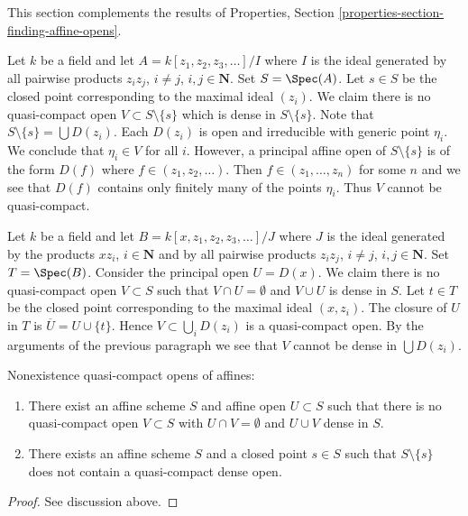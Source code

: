 \noindent
This section complements the results of
Properties, Section \ref{properties-section-finding-affine-opens}.

\medskip\noindent
Let $k$ be a field and let $A = k[z_1, z_2, z_3, \ldots]/I$ where $I$
is the ideal generated by all pairwise products
$z_iz_j$, $i \not = j$, $i, j \in \mathbf{N}$. Set $S = \Spec(A)$.
Let $s \in S$ be the closed point corresponding to the maximal
ideal $(z_i)$. We claim there is no
quasi-compact open $V \subset S \setminus \{s\}$ which is
dense in $S \setminus \{s\}$. Note that $S \setminus \{s\} = \bigcup D(z_i)$.
Each $D(z_i)$ is open and irreducible with generic point
$\eta_i$. We conclude that $\eta_i \in V$ for all $i$.
However, a principal affine open of $S \setminus \{s\}$ is
of the form $D(f)$ where $f \in (z_1, z_2, \ldots)$. Then
$f \in (z_1, \ldots, z_n)$ for some $n$ and we see that $D(f)$ contains
only finitely many of the points $\eta_i$. Thus $V$ cannot be quasi-compact.

\medskip\noindent
Let $k$ be a field and let $B = k[x, z_1, z_2, z_3, \ldots]/J$ where $J$
is the ideal generated by the products $xz_i$, $i \in \mathbf{N}$ and by
all pairwise products $z_iz_j$, $i \not = j$, $i, j \in \mathbf{N}$.
Set $T = \Spec(B)$. Consider the principal open $U = D(x)$.
We claim there is no quasi-compact open $V \subset S$ such that
$V \cap U = \emptyset$ and $V \cup U$ is dense in $S$.
Let $t \in T$ be the closed point corresponding to the maximal
ideal $(x, z_i)$. The closure of $U$ in $T$ is
$\overline{U} = U \cup \{t\}$. Hence $V \subset \bigcup_i D(z_i)$
is a quasi-compact open. By the arguments of the previous paragraph
we see that $V$ cannot be dense in $\bigcup D(z_i)$.

\begin{lemma}
\label{lemma-complement-of-affine-does-not-contain-qc-dense-open}
Nonexistence quasi-compact opens of affines:
\begin{enumerate}
\item There exist an affine scheme $S$ and affine open $U \subset S$
such that there is no quasi-compact open $V \subset S$ with
$U \cap V = \emptyset$ and $U \cup V$ dense in $S$.
\item There exists an affine scheme $S$ and a closed point $s \in S$ such that
$S \setminus \{s\}$ does not contain a quasi-compact dense open.
\end{enumerate}
\end{lemma}

\begin{proof}
See discussion above.
\end{proof}

